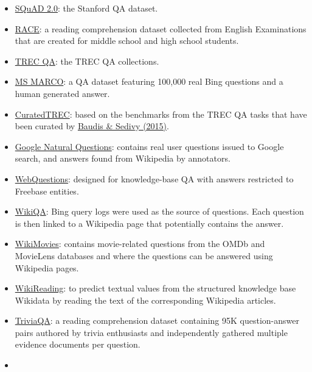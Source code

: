\begin{itemize}
\tightlist
\item
  \href{https://rajpurkar.github.io/SQuAD-explorer/}{SQuAD 2.0}: the Stanford QA dataset.
\item
  \href{http://www.qizhexie.com/data/RACE_leaderboard}{RACE}: a reading comprehension dataset collected from English Examinations that are created for middle school and high school students.
\item
  \href{https://trec.nist.gov/data/qa.html}{TREC QA}: the TREC QA collections.
\item
  \href{https://microsoft.github.io/msmarco/}{MS MARCO}: a QA dataset featuring 100,000 real Bing questions and a human generated answer.
\item
  \href{https://github.com/brmson/dataset-factoid-curated}{CuratedTREC}: based on the benchmarks from the TREC QA tasks that have been curated by \href{https://link.springer.com/chapter/10.1007\%2F978-3-319-24027-5_20}{Baudis \& Sedivy (2015)}.
\item
  \href{https://ai.google.com/research/NaturalQuestions/dataset}{Google Natural Questions}: contains real user questions issued to Google search, and answers found from Wikipedia by annotators.
\item
  \href{https://github.com/brmson/dataset-factoid-webquestions}{WebQuestions}: designed for knowledge-base QA with answers restricted to Freebase entities.
\item
  \href{https://www.microsoft.com/en-us/research/publication/wikiqa-a-challenge-dataset-for-open-domain-question-answering/}{WikiQA}: Bing query logs were used as the source of questions. Each question is then linked to a Wikipedia page that potentially contains the answer.
\item
  \href{https://research.fb.com/downloads/babi/}{WikiMovies}: contains movie-related questions from the OMDb and MovieLens databases and where the questions can be answered using Wikipedia pages.
\item
  \href{https://github.com/google-research-datasets/wiki-reading}{WikiReading}: to predict textual values from the structured knowledge base Wikidata by reading the text of the corresponding Wikipedia articles.
\item
  \href{https://nlp.cs.washington.edu/triviaqa/}{TriviaQA}: a reading comprehension dataset containing 95K question-answer pairs authored by trivia enthusiasts and independently gathered multiple evidence documents per question.
\item

\end{itemize}
